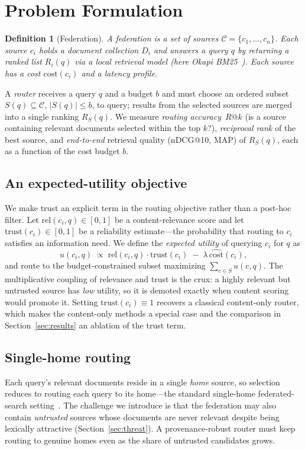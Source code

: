 \documentclass[preprint,12pt]{elsarticle}
\newcommand{\rel}{\mathrm{rel}}
\newcommand{\cost}{\mathrm{cost}}
\newcommand{\trust}{\mathrm{trust}}
\newtheorem{definition}{Definition}
\begin{document}
\section{Problem Formulation}\label{sec:problem}

\begin{definition}[Federation]
A \emph{federation} is a set of sources $\mathcal{C}=\{c_1,\dots,c_n\}$. Each
source $c_i$ holds a document collection $D_i$ and answers a query $q$ by
returning a ranked list $R_i(q)$ via a local retrieval model (here Okapi
BM25~\cite{robertson2009bm25}). Each source has a cost $\cost(c_i)$ and a latency
profile.
\end{definition}

A \emph{router} receives a query $q$ and a budget $b$ and must choose an ordered
subset $S(q)\subseteq\mathcal{C}$, $|S(q)|\le b$, to query; results from the
selected sources are merged into a single ranking $R_{S}(q)$. We measure
\emph{routing accuracy}~$R@k$ (is a source containing relevant documents selected
within the top $k$?), \emph{reciprocal rank} of the best source, and
\emph{end-to-end} retrieval quality (nDCG@10, MAP) of $R_{S}(q)$, each as a
function of the cost budget $b$.

\subsection{An expected-utility objective}
We make trust an explicit term in the routing objective rather than a
post-hoc filter. Let $\rel(c_i,q)\in[0,1]$ be a content-relevance score and let
$\trust(c_i)\in[0,1]$ be a reliability estimate---the probability that routing to
$c_i$ satisfies an information need. We define the \emph{expected utility} of
querying $c_i$ for $q$ as
\begin{equation}
u(c_i,q)\;\propto\;\rel(c_i,q)\cdot\trust(c_i)\;-\;\lambda\,\widehat{\cost}(c_i),
\label{eq:utility}
\end{equation}
and route to the budget-constrained subset maximizing $\sum_{c\in S}u(c,q)$. The
multiplicative coupling of relevance and trust is the crux: a highly relevant but
untrusted source has \emph{low} utility, so it is demoted exactly when content
scoring would promote it. Setting $\trust(c_i)\equiv 1$ recovers a classical
content-only router, which makes the content-only methods a special case and the
comparison in Section~\ref{sec:results} an ablation of the trust term.

\subsection{Single-home routing}
Each query's relevant documents reside in a single \emph{home} source, so
selection reduces to routing each query to its home---the standard single-home
federated-search setting~\cite{shokouhi2011federated}. The challenge we introduce
is that the federation may also contain \emph{untrusted} sources whose documents
are never relevant despite being lexically attractive (Section~\ref{sec:threat}).
A provenance-robust router must keep routing to genuine homes even as the share of
untrusted candidates grows.
\end{document}
